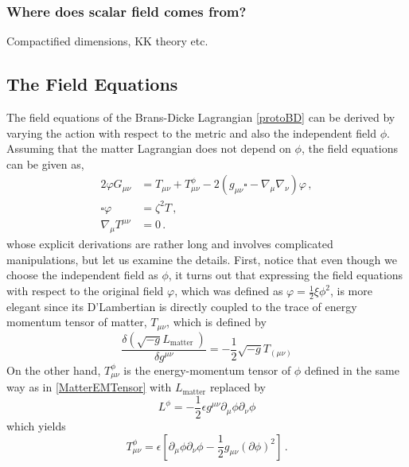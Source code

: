 \documentclass[12pt]{article}
\begin{document}
\subsubsection*{Where does scalar field comes from?}

Compactified dimensions, KK theory etc.

\subsection{The Field Equations}

The field equations of the Brans-Dicke Lagrangian \eqref{protoBD} can be derived by varying the action with respect to the metric and also the independent field $\phi$.
Assuming that the matter Lagrangian does not depend on $\phi$, the field equations can be given as,
\begin{equation}\label{BDFieldEqs}
\begin{aligned}
    2 \varphi G_{\mu \nu} & =T_{\mu \nu}+T_{\mu \nu}^\phi-2\left(g_{\mu \nu} \square-\nabla_\mu \nabla_\nu\right) \varphi \,,\\
    \square \varphi & =\zeta^2 T \, ,\\
    \nabla_\mu T^{\mu \nu} & =0 \,.
\end{aligned}
\end{equation}
whose explicit derivations are rather long and involves complicated manipulations, but let us examine the details. 
First, notice that even though we choose the independent field as $\phi$, it turns out that expressing the field equations with respect to the original field $\varphi$, which was defined as $\varphi=\frac{1}{2} \xi \phi^2$, is more elegant since its D'Lambertian is directly coupled to the trace of energy momentum tensor of matter, $T_{\mu \nu}$, which is defined by
\begin{equation}\label{MatterEMTensor}
\frac{\delta\left(\sqrt{-g} L_{\text {matter }}\right)}{\delta g^{\mu \nu}}=-\frac{1}{2} \sqrt{-g} T_{(\mu \nu)} 
\end{equation}
On the other hand, $T_{\mu \nu}^{\phi}$ is the energy-momentum tensor of $\phi$ defined in the same way as in \eqref{MatterEMTensor} with $L_{\text {matter}}$ replaced by
\begin{equation}
L^{\phi}=-\frac{1}{2} \epsilon g^{\mu \nu} \partial_{\mu} \phi \partial_{\nu} \phi
\end{equation}
which yields
\begin{equation}
T_{\mu \nu}^{\phi}=\epsilon\left[\partial_{\mu} \phi \partial_{\nu} \phi-\frac{1}{2} g_{\mu \nu}(\partial \phi)^{2}\right] \,.
\end{equation}
\end{document}
